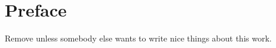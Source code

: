 \cleardoublepage
\chapter*{Preface}


Remove unless somebody else wants to write nice things about this work.


\lipsum[1-2]
